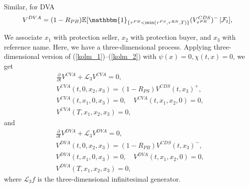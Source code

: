 Similar, for DVA
\begin{equation}
	V^{DVA} = (1 - R_{PB}) \mathbb{E}[\mathbbm{1}_{\{\tau^{PB} < \min(\tau^{PS}, \tau^{RN}, T)\}} (V^{CDS}_{\tau^{PB}})^{-} \, | \mathcal{F}_t],
\end{equation} 


We associate $x_1$ with protection seller, $x_2$ with protection buyer, and $x_3$ with reference name. Here, we have a three-dimensional process. Applying three-dimensional version of (\ref{kolm_1})--(\ref{kolm_2}) with $\psi(x) = 0, \chi(t, x) = 0$, we get
\begin{equation}
	\label{CVA_pde}
\begin{aligned}
		& \frac{\partial}{\partial t} V^{CVA} + \mathcal{L}_3 V^{CVA} = 0, \\
		& V^{CVA}(t, 0, x_2, x_3) = (1 - R_{PS}) V^{CDS}(t, x_3)^{+}, \\
		& V^{CVA}(t, x_1, 0, x_3 ) = 0, \quad V^{CVA}(t, x_1, x_2, 0)  = 0, \\
		& V^{CVA}(T, x_1, x_2, x_3) = 0,
\end{aligned}
\end{equation}
and
\begin{equation}
\label{DVA_pde}
\begin{aligned}
		& \frac{\partial}{\partial t} V^{DVA} + \mathcal{L}_3 V^{DVA} = 0, \\
		& V^{DVA}(t, 0, x_2, x_3) = (1 - R_{PB}) V^{CDS}(t, x_3)^{-}, \\
		& V^{DVA}(t, x_1, 0, x_3 ) = 0, \quad V^{DVA}(t, x_1, x_2, 0)  = 0, \\
		& V^{DVA}(T, x_1, x_2, x_3) = 0,
\end{aligned}
\end{equation}
where $\mathcal{L}_3 f$ is the three-dimensional infinitesimal generator.


